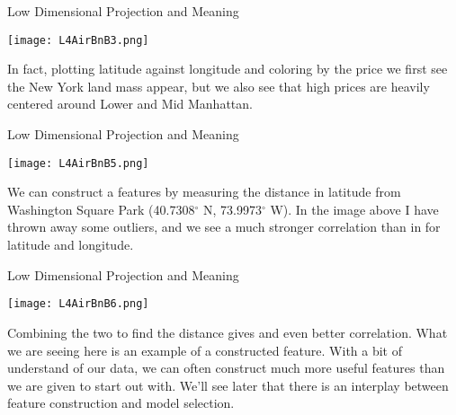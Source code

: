 \documentclass[10pt, table, dvipsnames,xcdraw,handout]{beamer}
\begin{document}
\begin{frame}[fragile]{Low Dimensional Projection and Meaning}
  \begin{minipage}[t][0.5\textheight][t]{\textwidth}
	\centering \texttt{[image: L4AirBnB3.png]}
  \end{minipage}
  \vfill
\begin{minipage}[t][0.5\textheight][t]{\textwidth}
In fact, plotting latitude against longitude and coloring by the price we first see the New York land mass appear, but we also see that high prices are heavily centered around Lower and Mid Manhattan.
\end{minipage}
\end{frame}



\begin{frame}[fragile]{Low Dimensional Projection and Meaning}
  \begin{minipage}[t][0.5\textheight][t]{\textwidth}
	\centering \texttt{[image: L4AirBnB5.png]}
  \end{minipage}
  \vfill
\begin{minipage}[t][0.5\textheight][t]{\textwidth}
We can construct a features by measuring the distance in latitude from Washington Square Park (40.7308$^\circ$ N, 73.9973$^\circ$ W). In the image above I have thrown away some outliers, and we see a much stronger correlation than in for latitude and longitude.
\end{minipage}
\end{frame}


\begin{frame}[fragile]{Low Dimensional Projection and Meaning}
  \begin{minipage}[t][0.5\textheight][t]{\textwidth}
	\centering \texttt{[image: L4AirBnB6.png]}
  \end{minipage}
  \vfill
\begin{minipage}[t][0.5\textheight][t]{\textwidth}
Combining the two to find the distance gives and even better correlation. What we are seeing here is an example of a constructed feature. With a bit of understand of our data, we can often construct much more useful features than we are given to start out with. We'll see later that there is an interplay between feature construction and model selection.
\end{minipage}
\end{frame}
\end{document}

